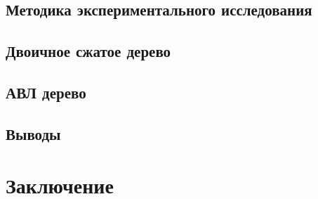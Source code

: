 \documentclass[a4peper, 12pt, titlepage, finall]{report}
\begin{document}
            \section{Методика экспериментального исследования}
            \section{Двоичное сжатое дерево}
            \section{АВЛ дерево}
            \section{Выводы}
        \chapter{Заключение}

\printbibliography{}
%
\end{document}
